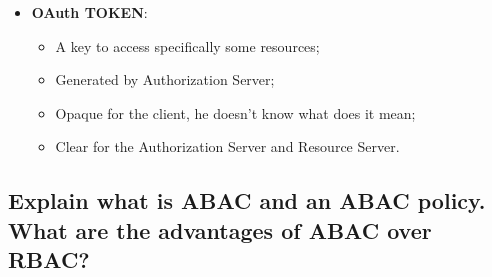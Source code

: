 \documentclass[9pt, letterpaper]{article}
\begin{document}
\begin{itemize}
\begin{itemize}
		\item \textbf{OAuth TOKEN}:
		\begin{itemize}
			\item A key to access specifically some resources;
			\item Generated by Authorization Server;
			\item Opaque for the client, he doesn't know what does it mean;
			\item Clear for the Authorization Server and Resource Server.
		\end{itemize}
	\end{itemize}
\end{itemize}

\newpage

\subsection{Explain what is ABAC and an ABAC policy. What are the advantages of ABAC over RBAC?}
\end{document}
